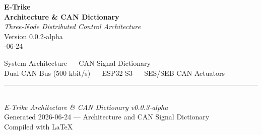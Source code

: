 \documentclass[12pt,a4paper,oneside]{report}
\begin{document}

\thispagestyle{empty}

\vspace*{60mm}

\begin{center}
  {\fontsize{28}{34}\selectfont\textbf{E-Trike}}\\[8mm]
  {\fontsize{22}{28}\selectfont\textbf{Architecture \& CAN Dictionary}}\\[20mm]
  {\fontsize{14}{18}\selectfont\textit{Three-Node Distributed Control Architecture}}\\[30mm]
  {\fontsize{12}{15}\selectfont Version 0.0.2-alpha}\\[4mm]
  {\fontsize{11}{14}-06-24}
\end{center}

\vfill

\begin{center}
  {\footnotesize
  System Architecture --- CAN Signal Dictionary\\[2mm]
  Dual CAN Bus (500 kbit/s) --- ESP32-S3 --- SES/SEB CAN Actuators
  }
\end{center}

\newpage


\setcounter{tocdepth}{1}
\tableofcontents
\newpage




\vfill

\begin{center}
  \rule{0.5\textwidth}{0.4pt}\\[4mm]
  {\small\textit{E-Trike Architecture \& CAN Dictionary v0.0.3-alpha}}\\[2mm]
  {\small Generated 2026-06-24 --- Architecture and CAN Signal Dictionary}\\[2mm]
  {\small Compiled with \LaTeX}
\end{center}
\end{document}
